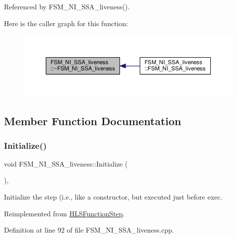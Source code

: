 Referenced by F\+S\+M\+\_\+\+N\+I\+\_\+\+S\+S\+A\+\_\+liveness().

Here is the caller graph for this function\+:
\nopagebreak
\begin{figure}[H]
\begin{center}
\leavevmode
\includegraphics[width=350pt]{d4/dd8/classFSM__NI__SSA__liveness_ad6fef7469f1ee413ab05d4ee208fc97e_icgraph}
\end{center}
\end{figure}


\subsection{Member Function Documentation}
\mbox{\label{classFSM__NI__SSA__liveness_a36cbd84735c2126d760d7fbdadab9d5e}} 
\subsubsection{\texorpdfstring{Initialize()}{Initialize()}}
{\footnotesize\ttfamily void F\+S\+M\+\_\+\+N\+I\+\_\+\+S\+S\+A\+\_\+liveness\+::\+Initialize (\begin{DoxyParamCaption}{ }\end{DoxyParamCaption})\hspace{0.3cm}{\ttfamily [override]}, {\ttfamily [virtual]}}



Initialize the step (i.\+e., like a constructor, but executed just before exec. 



Reimplemented from \hyperlink{classHLSFunctionStep_a966629ba62a8188ff4fa783ab0d4e319}{H\+L\+S\+Function\+Step}.



Definition at line 92 of file F\+S\+M\+\_\+\+N\+I\+\_\+\+S\+S\+A\+\_\+liveness.\+cpp.



